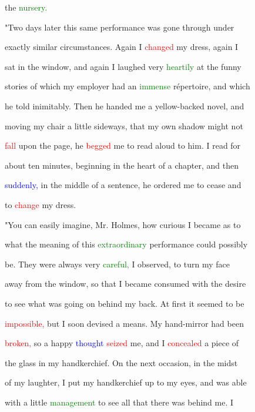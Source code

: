  the \textcolor{green}{nursery.}



 "Two days later this same performance was gone through under

 exactly similar circumstances. Again I \textcolor{red}{changed} my dress, again I

 sat in the window, and again I \textcolor{BurntOrange}{laughed} very \textcolor{green}{heartily} at the funny

 stories of which my employer had an \textcolor{green}{immense} répertoire, and which

 he told inimitably. Then he handed me a yellow-backed novel, and

 moving my chair a little sideways, that my own shadow might not

 \textcolor{red}{fall} upon the page, he \textcolor{red}{begged} me to read aloud to him. I read for

 about ten minutes, beginning in the heart of a chapter, and then

 \textcolor{blue}{suddenly,} in the middle of a \textcolor{BurntOrange}{sentence,} he ordered me to cease and

 to \textcolor{red}{change} my dress.



 "You can easily imagine, Mr. Holmes, how curious I became as to

 what the meaning of this \textcolor{green}{extraordinary} performance could possibly

 be. They were always very \textcolor{green}{careful,} I observed, to turn my face

 away from the window, so that I became consumed with the desire

 to see what was going on behind my back. At first it seemed to be

 \textcolor{red}{impossible,} but I soon devised a means. My hand-mirror had been

 \textcolor{red}{broken,} so a \textcolor{BurntOrange}{happy} \textcolor{blue}{thought} \textcolor{red}{seized} me, and I \textcolor{red}{concealed} a piece of

 the glass in my handkerchief. On the next occasion, in the midst

 of my \textcolor{BurntOrange}{laughter,} I put my handkerchief up to my eyes, and was able

 with a little \textcolor{green}{management} to see all that there was behind me. I

